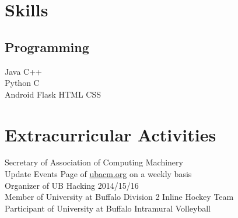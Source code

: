 \documentclass[letterpaper]{deedy-resume} %
\begin{document}
\begin{minipage}[t]{0.27\textwidth}
\section{Skills}

\subsection{Programming}

Java \textbullet{} C++ \\
Python \textbullet{} C \\
Android \textbullet{} Flask \textbullet{} HTML \textbullet{} CSS

\sectionspace %


\section{Extracurricular Activities} 

Secretary of Association of Computing Machinery \\
Update Events Page of \url{ubacm.org} on a weekly basis \\
Organizer of UB Hacking 2014/15/16 \\
Member of University at Buffalo Division 2 Inline Hockey Team \\
Participant of University at Buffalo Intramural Volleyball \\

\sectionspace %


\end{minipage} %
\hfill
%
%
\end{document}
